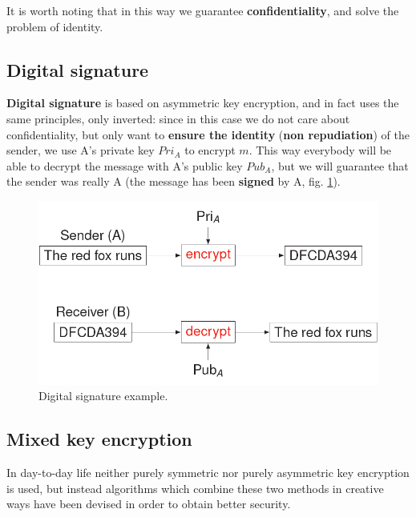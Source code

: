 It is worth noting that in this way we guarantee \textbf{confidentiality}, and solve the problem of identity.


\subsection{Digital signature}
\textbf{Digital signature} is based on asymmetric key encryption, and in fact uses the same principles, only inverted: since in this case we do not care about confidentiality, but only want to \textbf{ensure the identity} (\textbf{non repudiation}) of the sender, we use A's private key $Pri_A$ to encrypt $m$. This way everybody will be able to decrypt the message with A's public key $Pub_A$, but we will guarantee that the sender was really A (the message has been \textbf{signed} by A, fig. \ref{fig:ds}).

\begin{figure}[H]
\centering
\includegraphics[scale=0.5]{img/ds.png}
\decoRule
\caption{Digital signature example.}
\label{fig:ds}
\end{figure}


\subsection{Mixed key encryption}
In day-to-day life neither purely symmetric nor purely asymmetric key encryption is used, but instead algorithms which combine these two methods in creative ways have been devised in order to obtain better security.

